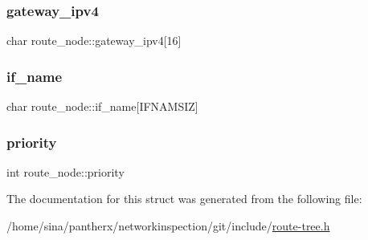 \mbox{\label{structroute__node_a17ee301a4563560e6b7262dff9c8c0b8}} 
\subsubsection{\texorpdfstring{gateway\+\_\+ipv4}{gateway\_ipv4}}
{\footnotesize\ttfamily char route\+\_\+node\+::gateway\+\_\+ipv4\mbox{[}16\mbox{]}}

\mbox{\label{structroute__node_a4be6a66a552d88f360585c636ee70680}} 
\subsubsection{\texorpdfstring{if\+\_\+name}{if\_name}}
{\footnotesize\ttfamily char route\+\_\+node\+::if\+\_\+name\mbox{[}I\+F\+N\+A\+M\+S\+IZ\mbox{]}}

\mbox{\label{structroute__node_a43cbb1b4e49fd4a12395fa28a9febecc}} 
\subsubsection{\texorpdfstring{priority}{priority}}
{\footnotesize\ttfamily int route\+\_\+node\+::priority}



The documentation for this struct was generated from the following file\+:\begin{DoxyCompactItemize}
\item 
/home/sina/pantherx/networkinspection/git/include/\hyperlink{route-tree_8h}{route-\/tree.\+h}\end{DoxyCompactItemize}
